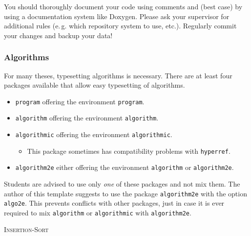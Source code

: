 You should thoroughly document your code using comments and (best case) by using a documentation system like Doxygen. Please ask your supervisor for additional rules (e.\,g. which repository system to use, etc.). Regularly commit your changes and backup your data!

\subsubsection{Algorithms}

For many theses, typesetting algorithms is necessary. There are at least four packages available that allow easy typesetting of algorithms.

\begin{itemize}
\item \texttt{program} offering the environment \texttt{program}.
\item \texttt{algorithm} offering the environment \texttt{algorithm}.
\item \texttt{algorithmic} offering the environment \texttt{algorithmic}.
	\begin{itemize}
	\item This package sometimes has compatibility problems with \texttt{hyperref}.
	\end{itemize}
\item \texttt{algorithm2e} either offering the environment \texttt{algorithm} or \texttt{algorithm2e}.
\end{itemize}

Students are advised to use only \emph{one} of these packages and not mix them. The author of this template suggests to use the package \texttt{algorithm2e} with the option \texttt{algo2e}. This prevents conflicts with other packages, just in case it is ever required to mix \texttt{algorithm} or \texttt{algorithmic} with \texttt{algorithm2e}.

\begin{algorithm2e}
\caption{\textsc{Insertion-Sort}}

\end{algorithm2e}

\clearpage


